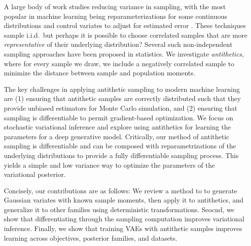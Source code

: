 A large body of work studies reducing variance in sampling, with the most popular in machine learning being  reparameterizations for some continuous distributions \cite{kingma2013auto,jang2016categorical} and control variates to adjust for estimated error \cite{mnih2014neural,weaver2001optimal}.
These techniques sample i.i.d.~but perhaps it is possible to choose correlated samples that are more \textit{representative} of their underlying distribution?
Several such non-independent sampling approaches have been proposed in statistics.
We investigate \textit{antithetics}, where for every sample we draw, we include a negatively correlated sample to minimize the distance between sample and population moments.

The key challenges in applying antithetic sampling to modern machine learning are (1) ensuring that antithetic samples are correctly distributed such that they provide unbiased estimators for Monte Carlo simulation, and (2) ensuring that sampling is differentiable to permit gradient-based optimization.
We focus on stochastic variational inference and explore using antithetics for learning the parameters for a deep generative model. %
Critically, our method of antithetic sampling is differentiable and can be composed with reparametrizations of the underlying distributions to provide a fully differentiable sampling process. This yields a simple and low variance way to optimize the parameters of the variational posterior.

Concisely, our contributions are as follows: We review a method to to generate Gaussian variates with known sample moments, then apply it to antithetics, and generalize it to other families using deterministic transformations. Seocnd, we show that differentiating through the sampling computation improves variational inference. Finally, we show that training VAEs with antithetic samples improves learning across objectives, posterior families, and datasets.

